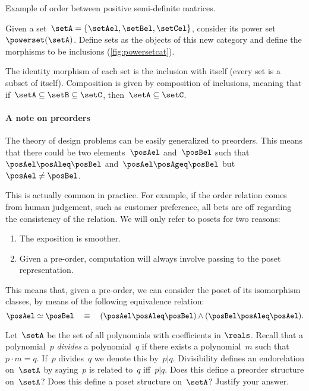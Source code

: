 \begin{marginfigure}
    \begin{center}
\end{center}
    \caption{Example of order between positive semi-definite matrices.}
    \label{fig:posdef_hasse}
\end{marginfigure}

  \begin{example}
    \label{ex:hasseinclusion}
    Given a set~$\setA=\{\setAel,\setBel,\setCel\}$, consider its power set~$\powerset(\setA)$.
    Define sets as the objects of this new category and define the morphisms to be inclusions (\cref{fig:powersetcat}).

    The identity morphism of each set is the inclusion with itself (every set is a subset of itself).
    Composition is given by composition of inclusions, meaning that if~$\setA\subseteq \setB \subseteq \setC$, then~$\setA\subseteq \setC$.
  \end{example}


\paragraph{A note on preorders}
The theory of design problems can be easily generalized to preorders.
This means that there could be two elements~$\posAel$ and~$\posBel$ such that~$\posAel\posAleq \posBel$ and~$\posAel \posAgeq \posBel$ but~$\posAel \neq \posBel$.

This is actually common in practice.
For example, if the order relation comes from human judgement, such as customer preference, all bets are off regarding the consistency of the relation.
We will only refer to posets for two reasons:
\begin{enumerate}
  \item The exposition is smoother.
  \item Given a pre-order, computation will always involve passing to the poset representation.
\end{enumerate}
This means that, given a pre-order, we can consider the poset of its isomorphism classes, by means of the following equivalence relation:
\begin{equation}
  \posAel \simeq \posBel \quad \equiv \quad (\posAel \posAleq \posBel) \wedge (\posBel \posAleq \posAel).
\end{equation}

\begin{gradedexercise}\label{ex:PolynomialDivisibility}
Let~$\setA$ be the set of all polynomials with coefficients in $\reals$.
Recall that a polynomial~$p$ \emph{divides} a polynomial~$q$ if there exists a polynomial~$m$ such that~$p \cdot m = q$.
If~$p$ divides~$q$ we denote this by~$p \vert q$.
Divisibility defines an endorelation on~$\setA$ by saying~$p$ is related to~$q$ iff~$p \vert q$.
Does this define a preorder structure on~$\setA$? Does this define a poset structure on~$\setA$? Justify your answer.
\end{gradedexercise}

